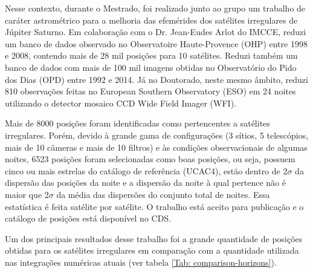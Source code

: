\documentclass[12pt,a4paper]{monografia}
\begin{document}
Nesse contexto, durante o Mestrado, foi realizado junto ao grupo um trabalho de caráter astrométrico para a melhoria das efemérides dos satélites irregulares de Júpiter Saturno. Em colaboração com o Dr. Jean-Eudes Arlot do IMCCE, reduzi um banco de dados observado no Observatoire Haute-Provence (OHP) entre 1998 e 2008, contendo mais de 28 mil posições para 10 satélites. Reduzi também um banco de dados com mais de 100 mil imagens obtidas no Observatório do Pido dos Dias (OPD) entre 1992 e 2014. Já no Doutorado, neste mesmo âmbito, reduzi 810 observações feitas no European Southern Observatory (ESO) em 24 noites utilizando o detector mosaico CCD Wide Field Imager (WFI).

Mais de 8000 posições foram identificadas como pertencentes a satélites irregulares. Porém, devido à grande gama de configurações (3 sítios, 5 telescópios, mais de 10 câmeras e mais de 10 filtros) e às condições observacionais de algumas noites, 6523 posições foram selecionadas como boas posições, ou seja, possuem cinco ou mais estrelas do catálogo de referência (UCAC4), estão dentro de 2$\sigma$ da dispersão das posições da noite e a dispersão da noite à qual pertence não é maior que 2$\sigma$ da média das dispersões do conjunto total de noites. Essa estatística é feita satélite por satélite. O trabalho está aceito para publicação \citep{GomesJunior2015-Irregular} e o catálogo de posições está disponível no CDS.

Um dos principais resultados desse trabalho foi a grande quantidade de posições obtidas para os satélites irregulares em comparação com a quantidade utilizada nas integrações numéricas atuais (ver tabela \ref{Tab: comparison-horizons}).
\end{document}
